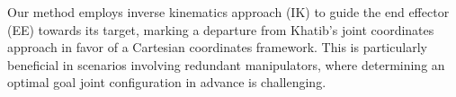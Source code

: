 \documentclass[]{article}
\begin{document}
%


Our method  employs inverse kinematics approach (IK) to guide the end effector (EE) towards its target, marking a departure from Khatib's joint coordinates approach in favor of a Cartesian coordinates framework. This is particularly beneficial in scenarios involving redundant manipulators, where determining an optimal goal joint configuration in advance is challenging.
\end{document}
